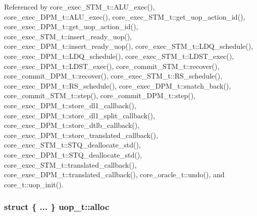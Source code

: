 Referenced by core\_\-exec\_\-STM\_\-t::ALU\_\-exec(), core\_\-exec\_\-DPM\_\-t::ALU\_\-exec(), core\_\-exec\_\-STM\_\-t::get\_\-uop\_\-action\_\-id(), core\_\-exec\_\-DPM\_\-t::get\_\-uop\_\-action\_\-id(), core\_\-exec\_\-STM\_\-t::insert\_\-ready\_\-uop(), core\_\-exec\_\-DPM\_\-t::insert\_\-ready\_\-uop(), core\_\-exec\_\-STM\_\-t::LDQ\_\-schedule(), core\_\-exec\_\-DPM\_\-t::LDQ\_\-schedule(), core\_\-exec\_\-STM\_\-t::LDST\_\-exec(), core\_\-exec\_\-DPM\_\-t::LDST\_\-exec(), core\_\-commit\_\-STM\_\-t::recover(), core\_\-commit\_\-DPM\_\-t::recover(), core\_\-exec\_\-STM\_\-t::RS\_\-schedule(), core\_\-exec\_\-DPM\_\-t::RS\_\-schedule(), core\_\-exec\_\-DPM\_\-t::snatch\_\-back(), core\_\-commit\_\-STM\_\-t::step(), core\_\-commit\_\-DPM\_\-t::step(), core\_\-exec\_\-DPM\_\-t::store\_\-dl1\_\-callback(), core\_\-exec\_\-DPM\_\-t::store\_\-dl1\_\-split\_\-callback(), core\_\-exec\_\-DPM\_\-t::store\_\-dtlb\_\-callback(), core\_\-exec\_\-DPM\_\-t::store\_\-translated\_\-callback(), core\_\-exec\_\-STM\_\-t::STQ\_\-deallocate\_\-std(), core\_\-exec\_\-DPM\_\-t::STQ\_\-deallocate\_\-std(), core\_\-exec\_\-STM\_\-t::translated\_\-callback(), core\_\-exec\_\-DPM\_\-t::translated\_\-callback(), core\_\-oracle\_\-t::undo(), and core\_\-t::uop\_\-init().
\subsubsection[{alloc}]{\setlength{\rightskip}{0pt plus 5cm}struct \{ ... \}   {\bf uop\_\-t::alloc}}\label{structuop__t_6f62c942e5cb41dfcf20a650a32fcc6b}




